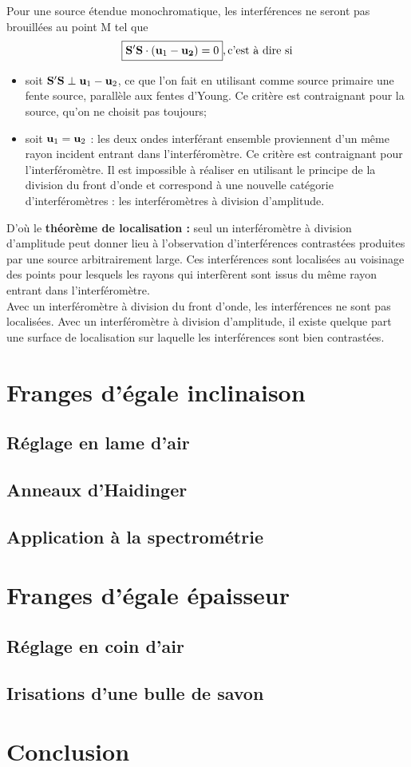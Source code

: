 \documentclass[11pt,a4paper]{report}
\begin{document}
Pour une source étendue monochromatique, les interférences ne seront pas brouillées au point M tel que
\begin{equation}
	\boxed{\bold{S'S}\cdot(\bold{u}_1 - \bold{u_2}) = 0}, \text{c'est à dire si}
\end{equation}
\begin{itemize}
	\item soit $\bold{S'S} \perp \bold{u}_1 - \bold{u}_2$, ce que l'on fait en utilisant comme source 			primaire une fente source, parallèle aux fentes d'Young. Ce critère est contraignant pour la 			source, qu'on ne choisit pas toujours;
	\item soit $\bold{u}_1 = \bold{u}_2$ : les deux ondes interférant ensemble proviennent d'un même 			rayon incident entrant dans l'interféromètre. Ce critère est contraignant pour 							l'interféromètre. Il est impossible à réaliser en utilisant le principe de la division du front 		d'onde et correspond à une nouvelle catégorie d'interféromètres : les interféromètres à 				division d'amplitude.
\end{itemize}

D'où le \textbf{théorème de localisation :} seul un interféromètre à division d'amplitude peut donner lieu à l'observation d'interférences contrastées produites par une source arbitrairement large. Ces interférences sont localisées au voisinage des points pour lesquels les rayons qui interfèrent sont issus du même rayon entrant dans l'interféromètre.\\

Avec un interféromètre à division du front d'onde, les interférences ne sont pas localisées. Avec un interféromètre à division d'amplitude, il existe quelque part une surface de localisation sur laquelle les interférences sont bien contrastées.

\newpage
\section{Franges d'égale inclinaison}
\subsection{Réglage en lame d'air}
\subsection{Anneaux d'Haidinger}
\subsection{Application à la spectrométrie}

\newpage
\section{Franges d'égale épaisseur}
\subsection{Réglage en coin d'air}
\subsection{Irisations d'une bulle de savon}


\newpage
\section*{Conclusion}
\end{document}
